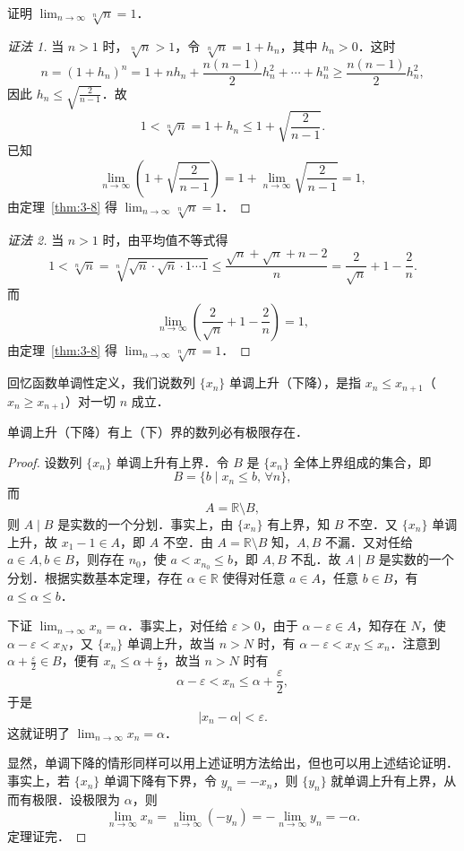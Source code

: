 \begin{example}\label{ex:3-2-13}
证明 $\lim_{n\to\infty}\sqrt[n]{n} = 1$．
\end{example}

\begin{proof}[证法 1]
当 $n > 1$ 时，$\sqrt[n]{n} > 1$，令 $\sqrt[n]{n} = 1 + h_n$，其中 $h_n > 0$．这时
\[
n = (1+h_n)^n = 1 + nh_n + \frac{n(n-1)}{2}h_n^2 + \cdots + h_n^n \geqslant \frac{n(n-1)}{2}h_n^2,
\]
因此 $h_n \leqslant \sqrt{\frac{2}{n-1}}$．故
\[
1 < \sqrt[n]{n} = 1 + h_n \leqslant 1 + \sqrt{\frac{2}{n-1}}.
\]
已知
\[
\lim_{n\to\infty}\left(1 + \sqrt{\frac{2}{n-1}}\right) = 1 + \lim_{n\to\infty}\sqrt{\frac{2}{n-1}} = 1,
\]
由定理~\ref{thm:3-8} 得 $\lim_{n\to\infty}\sqrt[n]{n} = 1$．
\end{proof}

\begin{proof}[证法 2]
当 $n>1$ 时，由平均值不等式得
\[
1 < \sqrt[n]{n} = \sqrt[n]{\sqrt{n}\cdot\sqrt{n}\cdot1\cdots1} \leqslant \frac{\sqrt{n} + \sqrt{n} + n - 2}{n} = \frac{2}{\sqrt{n}} + 1 - \frac{2}{n}.
\]
而
\[
\lim_{n\to\infty}\left(\frac{2}{\sqrt{n}} + 1 - \frac{2}{n}\right) = 1,
\]
由定理~\ref{thm:3-8} 得 $\lim_{n\to\infty}\sqrt[n]{n} = 1$．
\end{proof}

回忆函数单调性定义，我们说数列 $\{x_n\}$ 单调上升（下降），是指 $x_n \leqslant x_{n+1}$（$x_n \geqslant x_{n+1}$）对一切 $n$ 成立．

\begin{theorem}\label{thm:3-9}
单调上升（下降）有上（下）界的数列必有极限存在．
\end{theorem}

\begin{proof}
设数列 $\{x_n\}$ 单调上升有上界．令 $B$ 是 $\{x_n\}$ 全体上界组成的集合，即
\[
B = \{b\mid x_n \leqslant b,\,\forall n\},
\]
而
\[
A = \mathbb{R}\setminus B,
\]
则 $A \mid B$ 是实数的一个分划．事实上，由 $\{x_n\}$ 有上界，知 $B$ 不空．又 $\{x_n\}$ 单调上升，故 $x_1 - 1 \in A$，即 $A$ 不空．由 $A = \mathbb{R} \setminus B$ 知，$A,B$ 不漏．又对任给 $a \in A, b \in B$，则存在 $n_0$，使 $a < x_{n_0} \leqslant b$，即 $A,B$ 不乱．故 $A \mid B$ 是实数的一个分划．根据实数基本定理，存在 $\alpha \in \mathbb{R}$ 使得对任意 $a \in A$，任意 $b \in B$，有 $a \leqslant \alpha \leqslant b$．

下证 $\lim_{n\to\infty}x_n = \alpha$．事实上，对任给 $\varepsilon>0$，由于 $\alpha-\varepsilon \in A$，知存在 $N$，使 $\alpha-\varepsilon < x_N$，又 $\{x_n\}$ 单调上升，故当 $n>N$ 时，有 $\alpha-\varepsilon < x_N \leqslant x_n$．注意到 $\alpha+\frac{\varepsilon}{2} \in B$，便有 $x_n \leqslant \alpha+\frac{\varepsilon}{2}$，故当 $n>N$ 时有
\[
\alpha-\varepsilon < x_n \leqslant \alpha+\frac{\varepsilon}{2},
\]
于是
\[
|x_n - \alpha| < \varepsilon.
\]
这就证明了 $\lim_{n\to\infty}x_n = \alpha$．

显然，单调下降的情形同样可以用上述证明方法给出，但也可以用上述结论证明．事实上，若 $\{x_n\}$ 单调下降有下界，令 $y_n = -x_n$，则 $\{y_n\}$ 就单调上升有上界，从而有极限．设极限为 $\alpha$，则
\[
\lim_{n\to\infty}x_n = \lim_{n\to\infty}(-y_n) = -\lim_{n\to\infty}y_n = -\alpha.
\]
定理证完．
\end{proof}

